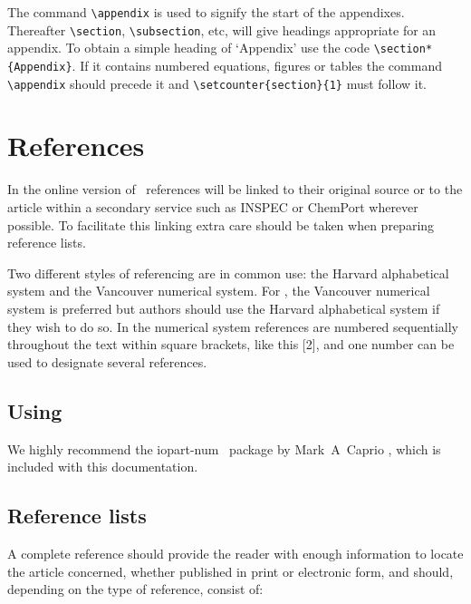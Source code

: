 \documentclass[a4paper]{jpconf}
\begin{document}
The command \verb"\appendix" is used to signify the start of the
appendixes. Thereafter \verb"\section", \verb"\subsection", etc, will 
give headings appropriate for an appendix. To obtain a simple heading of 
`Appendix' use the code \verb"\section*{Appendix}". If it contains
numbered equations, figures or tables the command \verb"\appendix" should
precede it and \verb"\setcounter{section}{1}" must follow it. 

\section{References}
In the online version of \jpcs\ references will be linked to their original source or to the article within a secondary service such as INSPEC or ChemPort wherever possible. To facilitate this linking extra care should be taken when preparing reference lists. 

Two different styles of referencing are in common use: the Harvard alphabetical system and the Vancouver numerical system.  For \jpcs, the Vancouver numerical system is preferred but authors should use the Harvard alphabetical system if they wish to do so. In the numerical system references are numbered sequentially throughout the text within square brackets, like this [2], and one number can be used to designate several references.  

\subsection{Using \BibTeX}
We highly recommend the {\ttfamily\textbf\selectfont iopart-num} \BibTeX\ package by Mark~A~Caprio \cite{iopartnum}, which is included with this documentation.

\subsection{Reference lists}
A complete reference should provide the reader with enough information to locate the article concerned, whether published in print or electronic form, and should, depending on the type of reference, consist of:  
\end{document}
